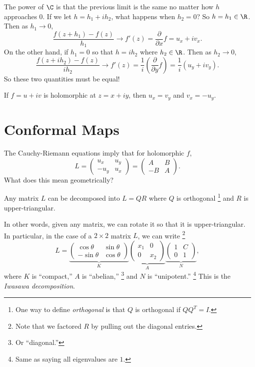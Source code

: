 The power of $\C$ is that the previous limit is the same
no matter how $h$ approaches $0$. If we let
$h = h_1 + ih_2$, what happens when $h_2 = 0$? So
$h = h_1 \in \R$. Then as $h_1 \to 0$,
\[
  \frac{f(z + h_1) - f(z)}{h_1} \to f'(z) = \frac{\partial}{\partial x} f = u_x + iv_x
.\] 
On the other hand, if $h_1 = 0$ so that $h = ih_2$
where $h_2 \in \R$. Then as $h_2 \to 0$,
 \[
   \frac{f(z + ih_2) - f(z)}{ih_2} \to f'(z) = \frac{1}{i}\left(\frac{\partial}{\partial y} f\right) = \frac{1}{i} (u_y + iv_y)
.\]
So these two quantities must be equal!

\begin{tcolorbox}[title=Theorem (Cauchy-Riemann equations)]
  If $f = u + iv$ is holomorphic at $z = x + iy$, then
  $u_x = v_y$ and $v_x = -u_y$.
\end{tcolorbox}

\section{Conformal Maps}
The Cauchy-Riemann equations imply that for holomorphic
$f$,
\[
L =
\left(\begin{matrix}
  u_x & u_y \\
  -u_y & u_x
\end{matrix}\right) =
\left(\begin{matrix}
    A & B \\
    -B & A
\end{matrix}\right)
.\]
What does this mean geometrically?

\begin{tcolorbox}[title=Theorem ($QR$ decomposition)]
  Any matrix $L$ can be decomposed into $L = QR$ where
  $Q$ is orthogonal
  \footnote{One way to define \textit{orthogonal} is that
    $Q$ is orthogonal if $QQ^T = I$.}
  and $R$ is upper-triangular.
\end{tcolorbox}

In other words, given any matrix, we can rotate it so that
it is upper-triangular. In particular, in the case of a
$2 \times 2$ matrix $L$, we can write
\footnote{Note that we factored $R$ by pulling out the
diagonal entries.}
\[
L =
\underbrace{\left(\begin{matrix}
    \cos \theta & \sin \theta \\
    -\sin \theta & \cos \theta
\end{matrix}\right)}_{K}
\underbrace{\left(\begin{matrix}
    x_1 & 0 \\
    0 & x_2
\end{matrix}\right)}_{A}
\underbrace{\left(\begin{matrix}
    1 & C \\
    0 & 1
\end{matrix}\right)}_{N}
,\]
where $K$ is ``compact,'' $A$ is ``abelian,''
\footnote{Or ``diagonal.''}
and $N$ is ``unipotent.''
\footnote{Same as saying all eigenvalues are $1$.}
This is the \textit{Iwasawa decomposition}.

